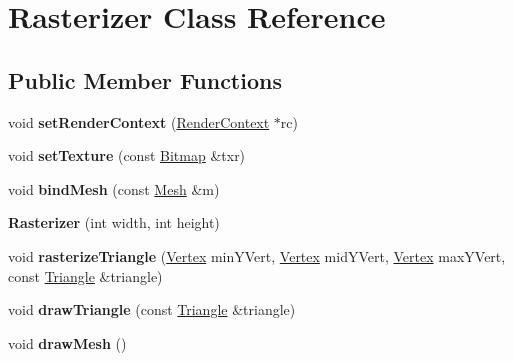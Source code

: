 \hypertarget{class_rasterizer}{}\section{Rasterizer Class Reference}
\label{class_rasterizer}
\subsection*{Public Member Functions}
\begin{DoxyCompactItemize}
\item 
\hypertarget{class_rasterizer_accac2d0878675f9fe01ae2fedd30f84f}{}void {\bfseries set\+Render\+Context} (\hyperlink{class_render_context}{Render\+Context} $\ast$rc)\label{class_rasterizer_accac2d0878675f9fe01ae2fedd30f84f}

\item 
\hypertarget{class_rasterizer_a401966b0d0572d8c944e6b319515ac5e}{}void {\bfseries set\+Texture} (const \hyperlink{class_bitmap}{Bitmap} \&txr)\label{class_rasterizer_a401966b0d0572d8c944e6b319515ac5e}

\item 
\hypertarget{class_rasterizer_a4e43391ca21604f52d4baabc44b34933}{}void {\bfseries bind\+Mesh} (const \hyperlink{class_mesh}{Mesh} \&m)\label{class_rasterizer_a4e43391ca21604f52d4baabc44b34933}

\item 
\hypertarget{class_rasterizer_a2eec0e17ef479f0e0af5640d6786e077}{}{\bfseries Rasterizer} (int width, int height)\label{class_rasterizer_a2eec0e17ef479f0e0af5640d6786e077}

\item 
\hypertarget{class_rasterizer_a39a7b6f424f2bc8e7111892cbf387509}{}void {\bfseries rasterize\+Triangle} (\hyperlink{struct_vertex}{Vertex} min\+Y\+Vert, \hyperlink{struct_vertex}{Vertex} mid\+Y\+Vert, \hyperlink{struct_vertex}{Vertex} max\+Y\+Vert, const \hyperlink{struct_triangle}{Triangle} \&triangle)\label{class_rasterizer_a39a7b6f424f2bc8e7111892cbf387509}

\item 
\hypertarget{class_rasterizer_a3be827df6aeec982f2a1e5106ee6e99b}{}void {\bfseries draw\+Triangle} (const \hyperlink{struct_triangle}{Triangle} \&triangle)\label{class_rasterizer_a3be827df6aeec982f2a1e5106ee6e99b}

\item 
\hypertarget{class_rasterizer_ab2d26833e9b47e3e1a1b9e94a77d0a18}{}void {\bfseries draw\+Mesh} ()\label{class_rasterizer_ab2d26833e9b47e3e1a1b9e94a77d0a18}


\end{DoxyCompactItemize}
